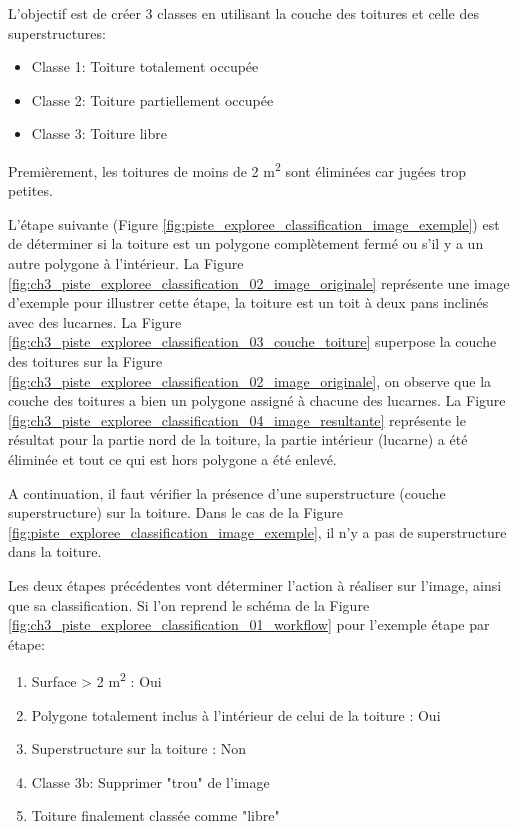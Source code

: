 L'objectif est de créer 3 classes en utilisant la couche des toitures et celle des superstructures:
\begin{itemize}
    \item Classe 1: Toiture totalement occupée
    \item Classe 2: Toiture partiellement occupée
    \item Classe 3: Toiture libre
\end{itemize}
Premièrement, les toitures de moins de 2 \si{\unit{\square\meter}} sont éliminées car jugées trop petites.

L'étape suivante (Figure \ref{fig:piste_exploree_classification_image_exemple}) est de déterminer si la toiture est un polygone complètement fermé ou s'il y a un autre polygone à l'intérieur. La Figure \ref{fig:ch3_piste_exploree_classification_02_image_originale} représente une image d'exemple pour illustrer cette étape, la toiture est un toit à deux pans inclinés avec des lucarnes. La Figure \ref{fig:ch3_piste_exploree_classification_03_couche_toiture} superpose la couche des toitures sur la Figure \ref{fig:ch3_piste_exploree_classification_02_image_originale}, on observe que la couche des toitures a bien un polygone assigné à chacune des lucarnes. La Figure \ref{fig:ch3_piste_exploree_classification_04_image_resultante} représente le résultat pour la partie nord de la toiture, la partie intérieur (lucarne) a été éliminée et tout ce qui est hors polygone a été enlevé.

A continuation, il faut vérifier la présence d'une superstructure (couche superstructure) sur la toiture. Dans le cas de la Figure \ref{fig:piste_exploree_classification_image_exemple}, il n'y a pas de superstructure dans la toiture.

Les deux étapes précédentes vont déterminer l'action à réaliser sur l'image, ainsi que sa classification. Si l'on reprend le schéma de la Figure \ref{fig:ch3_piste_exploree_classification_01_workflow} pour l'exemple étape par étape:
\begin{enumerate}
    \item Surface > 2 \si{\unit{\square\meter}} : Oui
    \item Polygone totalement inclus à l'intérieur de celui de la toiture : Oui
    \item Superstructure sur la toiture : Non
    \item Classe 3b: Supprimer "trou" de l'image
    \item Toiture finalement classée comme "libre"
\end{enumerate}

